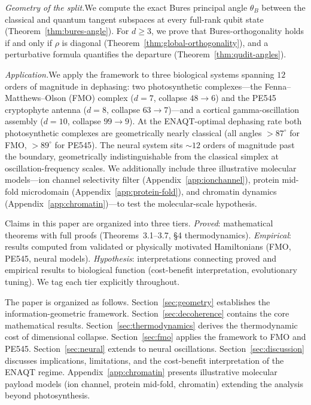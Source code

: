 \documentclass[12pt,a4paper]{article}
\theoremstyle{definition}
\theoremstyle{remark}
\begin{document}
\medskip\noindent\emph{Geometry of the split.}\quad We compute the exact Bures principal angle $\theta_B$ between the classical and quantum tangent subspaces at every full-rank qubit state (Theorem~\ref{thm:bures-angle}). For $d \geq 3$, we prove that Bures-orthogonality holds if and only if $\rho$ is diagonal (Theorem~\ref{thm:global-orthogonality}), and a perturbative formula quantifies the departure (Theorem~\ref{thm:qudit-angles}).

\medskip\noindent\emph{Application.}\quad We apply the framework to three biological systems spanning $12$ orders of magnitude in dephasing: two photosynthetic complexes---the Fenna--Matthews--Olson (FMO) complex ($d = 7$, collapse $48 \to 6$) and the PE545 cryptophyte antenna ($d = 8$, collapse $63 \to 7$)---and a cortical gamma-oscillation assembly ($d = 10$, collapse $99 \to 9$). At the ENAQT-optimal dephasing rate both photosynthetic complexes are geometrically nearly classical (all angles $> 87^\circ$ for FMO, $> 89^\circ$ for PE545). The neural system sits ${\sim}12$ orders of magnitude past the boundary, geometrically indistinguishable from the classical simplex at oscillation-frequency scales. We additionally include three illustrative molecular models---ion channel selectivity filter (Appendix~\ref{app:ionchannel}), protein mid-fold microdomain (Appendix~\ref{app:protein-fold}), and chromatin dynamics (Appendix~\ref{app:chromatin})---to test the molecular-scale hypothesis.

Claims in this paper are organized into three tiers. \emph{Proved}: mathematical theorems with full proofs (Theorems~3.1--3.7, \S4 thermodynamics). \emph{Empirical}: results computed from validated or physically motivated Hamiltonians (FMO, PE545, neural models). \emph{Hypothesis}: interpretations connecting proved and empirical results to biological function (cost-benefit interpretation, evolutionary tuning). We tag each tier explicitly throughout.

The paper is organized as follows. Section~\ref{sec:geometry} establishes the information-geometric framework. Section~\ref{sec:decoherence} contains the core mathematical results. Section~\ref{sec:thermodynamics} derives the thermodynamic cost of dimensional collapse. Section~\ref{sec:fmo} applies the framework to FMO and PE545. Section~\ref{sec:neural} extends to neural oscillations. Section~\ref{sec:discussion} discusses implications, limitations, and the cost-benefit interpretation of the ENAQT regime. Appendix~\ref{app:chromatin} presents illustrative molecular payload models (ion channel, protein mid-fold, chromatin) extending the analysis beyond photosynthesis.
\end{document}
